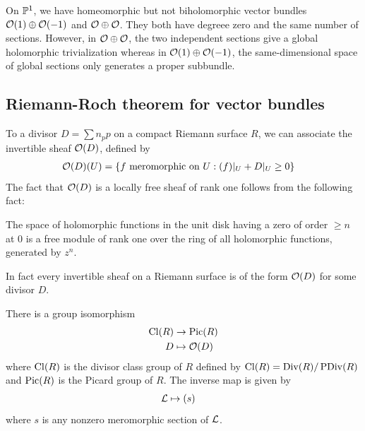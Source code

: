 \documentclass[12pt]{article}
\begin{document}
\begin{example}
    On $\P^1$, we have homeomorphic but not biholomorphic vector bundles $\cO(1) \oplus \cO(-1)$ and $\cO \oplus \cO$. They both have degreee zero and the same number of sections. However, in \(\cO\oplus\cO\), the two independent sections give a global holomorphic trivialization whereas in \(\cO(1)\oplus\cO(-1)\), the same-dimensional space of global sections only generates a proper subbundle.
\end{example}

\subsection{Riemann-Roch theorem for vector bundles}
To a divisor $D = \sum n_p p$ on a compact Riemann surface $R$, we can associate the invertible sheaf $\cO(D)$, defined by \begin{align*}
    \cO(D)(U) & = \{f \text{ meromorphic on } U : (f)|_U + D|_U \geq 0\}
\end{align*} The fact that $\cO(D)$ is a locally free sheaf of rank one follows from the following fact:

\begin{lemma}
    The space of holomorphic functions in the unit disk having a zero of order $\geq n$ at 0 is a free module of rank one over the ring of all holomorphic functions, generated by $z^n$.
\end{lemma}

In fact every invertible sheaf on a Riemann surface is of the form $\cO(D)$ for some divisor $D$.

\begin{theorem}
    There is a group isomorphism \begin{align*}
        \Cl(R) & \to \Pic(R) \\
        D & \mapsto \mathcal{O}(D)
    \end{align*} where $\Cl(R)$ is the divisor class group of $R$ defined by $\Cl(R) = \Div(R)/\PDiv(R)$ and $\Pic(R)$ is the Picard group of $R$. The inverse map is given by \begin{align*}
        \cL & \mapsto (s)
    \end{align*} where $s$ is any nonzero meromorphic section of $\cL$.
\end{theorem}
\end{document}
